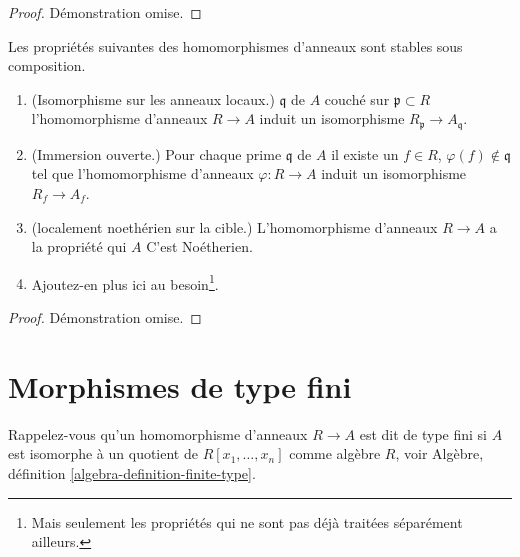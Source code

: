 \begin{proof}
Démonstration omise.
\end{proof}

\begin{lemma}

\label{lemma-properties-composition}

Les propriétés suivantes des homomorphismes d'anneaux sont stables sous composition.

\begin{enumerate}

\item (Isomorphisme sur les anneaux locaux.) $\mathfrak q$ de $A$ couché sur $\mathfrak p \subset R$
l'homomorphisme d'anneaux $R \to A$ induit un isomorphisme
$R_{\mathfrak p} \to A_{\mathfrak q}$.
\item (Immersion ouverte.) Pour chaque prime $\mathfrak q$ de $A$ il existe un $f \in R$,
$\varphi(f) \not \in \mathfrak q$ tel que l'homomorphisme d'anneaux $\varphi : R \to A$
induit un isomorphisme $R_f \to A_f$.
\item (localement noethérien sur la cible.) L'homomorphisme d'anneaux $R \to A$ a la propriété qui $A$ C'est Noétherien.
\item Ajoutez-en plus ici au besoin\footnote{Mais seulement les propriétés qui ne sont pas déjà traitées séparément ailleurs.}.

\end{enumerate}

\end{lemma}

\begin{proof}
Démonstration omise.
\end{proof}








\section{Morphismes de type fini}
\label{section-finite-type}

\noindent
Rappelez-vous qu'un homomorphisme d'anneaux $R \to A$ est dit de type fini si $A$ est isomorphe à un quotient de $R[x_1, \ldots, x_n]$ comme algèbre $R$, voir Algèbre, définition \ref{algebra-definition-finite-type}.

